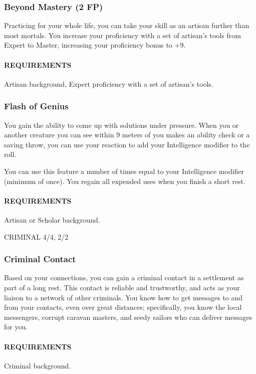     \subsubsection{Beyond Mastery (2 FP)} \label{feat::beyondmastery}
        Practicing for your whole life, you can take your skill as an artisan further than most mortals.
        You increase your proficiency with a set of artisan's tools from Expert to Master, increasing your proficiency bonus to +9.
        \paragraph{REQUIREMENTS} Artisan background, Expert proficiency with a set of artisan's tools.

    \subsubsection{Flash of Genius} \label{feat::flashofgenius}
        You gain the ability to come up with solutions under pressure.
        When you or another creature you can see within 9 meters of you makes an ability check or a saving throw, you can use your reaction to add your Intelligence modifier to the roll.

        You can use this feature a number of times equal to your Intelligence modifier (minimum of once).
        You regain all expended uses when you finish a short rest.
        \paragraph{REQUIREMENTS} Artisan or Scholar background.

CRIMINAL 4/4, 2/2
    \subsubsection{Criminal Contact} \label{feat::criminalcontact}
        Based on your connections, you can gain a criminal contact in a settlement as part of a long rest.
        This contact is reliable and trustworthy, and acts as your liaison to a network of other criminals.
        You know how to get messages to and from your contacts, even over great distances; specifically, you know the local messengers, corrupt caravan masters, and seedy sailors who can deliver messages for you.
        \paragraph{REQUIREMENTS} Criminal background.

